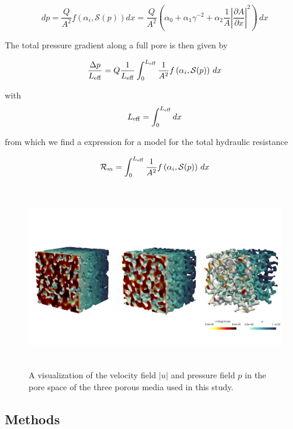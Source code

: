 \documentclass[draft]{agujournal2019}
\begin{document}
\begin{equation}\label{eq:infi_dp}
	dp = \frac{Q}{A^2} f\left(\alpha_i,\mathcal{S}(p)\right) dx= \frac{Q}{A^2}\left(\alpha_0+\alpha_1\gamma^{-2} + \alpha_2 \frac{1}{A}\left|\frac{\partial A}{\partial x }\right|^2\right)\,dx
\end{equation}

The total pressure gradient along a full pore is then given by 

\begin{equation}
	\frac{\Delta p}{L_{\rm{eff}}} =  Q \frac{1}{L_{\rm{eff}}}\int^{L_{\rm{eff}}}_{0}\frac{1}{A^2}f\left(\alpha_i,\mathcal{S}(p)\right)\,dx
\end{equation}

with 
\begin{equation}
	L_{\rm{eff}} = \int^{L_{\rm{eff}}}_{0} dx
\end{equation}

from which we find a expression for a model for the total hydraulic resistance 

\begin{equation}\label{eq:R_model}
	\mathcal{R}_m = \int^{L_{\rm{eff}}}_{0}\frac{1}{A^2}f\left(\alpha_i,\mathcal{S}(p)\right)\,dx
\end{equation}


\begin{figure}[t!]\label{fig:DNS}
\includegraphics[height=8cm]{figures/PM_combined_surfaces_DNS.png}
\caption{A visualization of the velocity field $|u|$ and pressure field $p$ in the pore space of the three porous media used in this study.}
\end{figure}


\subsection{Methods}
\end{document}
